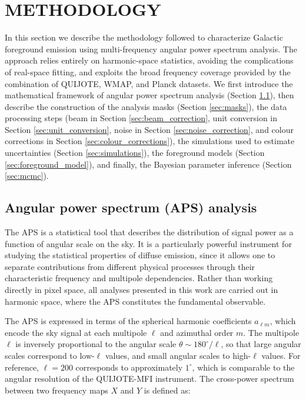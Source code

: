 \section{METHODOLOGY}
\label{sec:methodology}

In this section we describe the methodology followed to characterize Galactic foreground emission using multi-frequency angular power spectrum analysis. The approach relies entirely on harmonic-space statistics, avoiding the complications of real-space fitting, and exploits the broad frequency coverage provided by the combination of QUIJOTE, WMAP, and Planck datasets. We first introduce the mathematical framework of angular power spectrum analysis (Section \ref{sec:power_spectrum}), then describe the construction of the analysis masks (Section \ref{sec:masks}), the data processing steps (beam in Section \ref{sec:beam_correction}, unit conversion in Section \ref{sec:unit_conversion}, noise in Section \ref{sec:noise_correction}, and colour corrections in Section \ref{sec:colour_corrections}), the simulations used to estimate uncertainties (Section \ref{sec:simulations}), the foreground models (Section \ref{sec:foreground_model}), and finally, the Bayesian parameter inference (Section \ref{sec:mcmc}).

\subsection{Angular power spectrum (APS) analysis}
\label{sec:power_spectrum}

The APS is a statistical tool that describes the distribution of signal power as a function of angular scale on the sky. It is a particularly powerful instrument for studying the statistical properties of diffuse emission, since it allows one to separate contributions from different physical processes through their characteristic frequency and multipole dependencies. Rather than working directly in pixel space, all analyses presented in this work are carried out in harmonic space, where the APS constitutes the fundamental observable.

The APS is expressed in terms of the spherical harmonic coefficients $a_{\ell m}$, which encode the sky signal at each multipole $\ell$ and azimuthal order $m$. The multipole $\ell$ is inversely proportional to the angular scale $\theta \sim 180^\circ / \ell$, so that large angular scales correspond to low-$\ell$ values, and small angular scales to high-$\ell$ values. For reference, $\ell = 200$ corresponds to approximately $1^\circ$, which is comparable to the angular resolution of the QUIJOTE-MFI instrument. The cross-power spectrum between two frequency maps $X$ and $Y$ is defined as:

